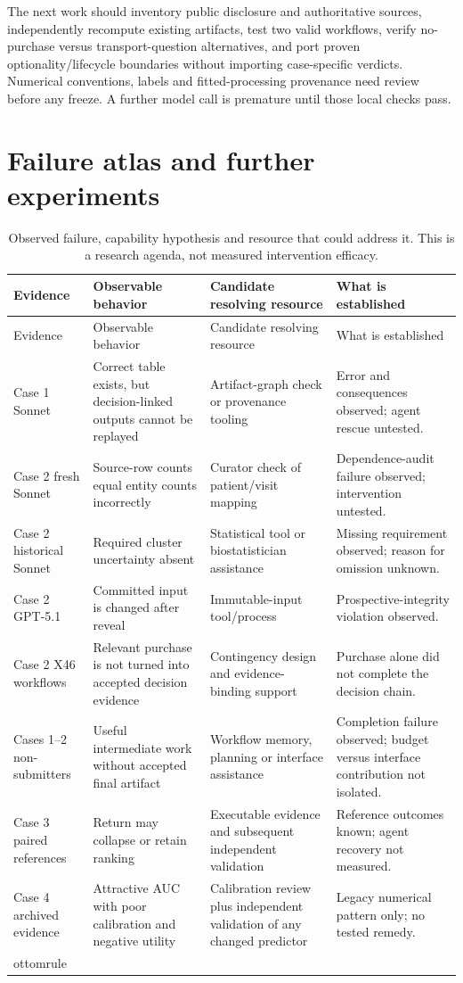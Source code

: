 \documentclass[11pt,a4paper]{article}
\begin{document}
The next work should inventory public disclosure and authoritative sources, independently recompute existing artifacts, test two valid workflows, verify no-purchase versus transport-question alternatives, and port proven optionality/lifecycle boundaries without importing case-specific verdicts. Numerical conventions, labels and fitted-processing provenance need review before any freeze. A further model call is premature until those local checks pass.

\section{Failure atlas and further experiments}

\begin{longtable}{@{}p{}p{}p{}p{}@{}}
\caption{Observed failure, capability hypothesis and resource that could address it. This is a research agenda, not measured intervention efficacy.}\\
\toprule Evidence & Observable behavior & Candidate resolving resource & What is established \\\midrule\endfirsthead
\toprule Evidence & Observable behavior & Candidate resolving resource & What is established \\\midrule\endhead
Case 1 Sonnet & Correct table exists, but decision-linked outputs cannot be replayed & Artifact-graph check or provenance tooling & Error and consequences observed; agent rescue untested. \\
Case 2 fresh Sonnet & Source-row counts equal entity counts incorrectly & Curator check of patient/visit mapping & Dependence-audit failure observed; intervention untested. \\
Case 2 historical Sonnet & Required cluster uncertainty absent & Statistical tool or biostatistician assistance & Missing requirement observed; reason for omission unknown. \\
Case 2 GPT-5.1 & Committed input is changed after reveal & Immutable-input tool/process & Prospective-integrity violation observed. \\
Case 2 X46 workflows & Relevant purchase is not turned into accepted decision evidence & Contingency design and evidence-binding support & Purchase alone did not complete the decision chain. \\
Cases 1--2 non-submitters & Useful intermediate work without accepted final artifact & Workflow memory, planning or interface assistance & Completion failure observed; budget versus interface contribution not isolated. \\
Case 3 paired references & Return may collapse or retain ranking & Executable evidence and subsequent independent validation & Reference outcomes known; agent recovery not measured. \\
Case 4 archived evidence & Attractive AUC with poor calibration and negative utility & Calibration review plus independent validation of any changed predictor & Legacy numerical pattern only; no tested remedy. \\\ottomrule
\end{longtable}
\end{document}
